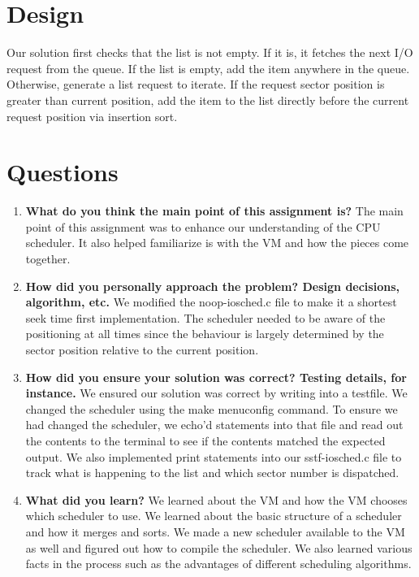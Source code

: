 \documentclass[onecolumn, draftclsnofoot,10pt, compsoc]{IEEEtran}
\begin{document}


\section{Design}
Our solution first checks that the list is not empty. If it is, it fetches the next I/O request from the queue. If the list is empty, add the item anywhere in the queue.  Otherwise, generate a list request to iterate. If the request sector position is greater than current position, add the item to the list directly before the current request position via insertion sort. 
	
\section{Questions}

\begin{enumerate}
\item \textbf{What do you think the main point of this assignment is?}
The main point of this assignment was to enhance our understanding of the CPU scheduler. It also helped familiarize is with the VM and how the pieces come together. 

\item \textbf{How did you personally approach the problem? Design decisions, algorithm, etc.}
We modified the noop-iosched.c file to make it a shortest seek time first implementation. The scheduler needed to be aware of the positioning at all times since the behaviour is largely determined by the sector position relative to the current position. 

\item \textbf{How did you ensure your solution was correct? Testing details, for instance.}
We ensured our solution was correct by writing into a testfile. We changed the scheduler using the make menuconfig command. To ensure we had changed the scheduler, we echo'd statements into that file and read out the contents to the terminal to see if the contents matched the expected output. We also implemented print statements into our sstf-iosched.c file to track what is happening to the list and which sector number is dispatched.  
\item \textbf{What did you learn?}
We learned about the VM and how the VM chooses which scheduler to use. We learned about the basic structure of a scheduler and how it merges and sorts. We made a new scheduler available to the VM as well and figured out how to compile the scheduler. We also learned various facts in the process such as the advantages of different scheduling algorithms.

\end{enumerate}
\end{document}
